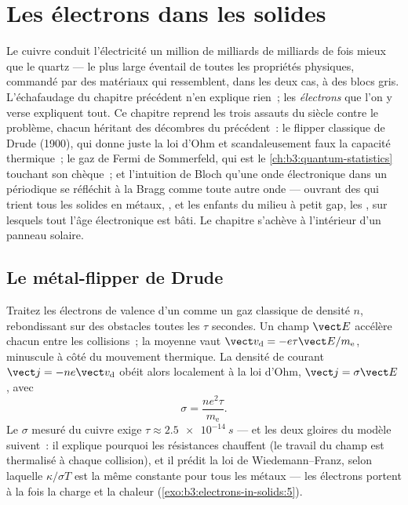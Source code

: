 \chapter{Les électrons dans les solides}\label{ch:b3:electrons-in-solids}


Le cuivre conduit l'électricité un million de milliards de milliards
de fois mieux que le quartz --- le plus large éventail de toutes les
propriétés physiques, commandé par des matériaux qui ressemblent, dans
les deux cas, à des blocs gris. L'échafaudage du chapitre précédent
n'en explique rien~; les \emph{électrons} que l'on y verse expliquent
tout. Ce chapitre reprend les trois assauts du siècle contre le
problème, chacun héritant des décombres du précédent~: le flipper
classique de Drude (1900), qui donne juste la loi d'Ohm et
scandaleusement faux la capacité thermique~; le gaz de Fermi de
Sommerfeld, qui est le \cref{ch:b3:quantum-statistics} touchant son
chèque~; et l'intuition de Bloch qu'une onde électronique dans un
 périodique se réfléchit à la Bragg comme toute autre onde ---
ouvrant des \emph{} qui trient tous les solides en
métaux, , et les enfants du milieu à petit gap, les
, sur lesquels tout l'âge électronique est bâti. Le
chapitre s'achève à l'intérieur d'un panneau solaire.

\section{Le métal-flipper de Drude}

\begin{proposition}\label{prop:b3:electrons-in-solids:drude}
Traitez les électrons de valence d'un  comme un gaz classique de
densité $n$, rebondissant sur des obstacles toutes les $\tau$
secondes. Un champ $\vect E$ accélère chacun entre les collisions~; la
\emph{} moyenne vaut
$\vect v_{\text{d}} = -e\tau\vect E/m_{\text{e}}$, minuscule à côté du
mouvement thermique. La densité de courant $\vect j =
-ne\vect v_{\text{d}}$ obéit alors localement à la loi d'Ohm,
$\vect j = \sigma\vect E$, avec
\[
\sigma = \frac{ne^2\tau}{m_{\text{e}}} .
\]
Le $\sigma$ mesuré du cuivre exige $\tau \approx \qty{2.5e-14}{s}$
--- et les deux gloires du modèle suivent~: il explique pourquoi les
résistances chauffent (le travail du champ est thermalisé à chaque
collision), et il prédit la loi de Wiedemann--Franz, selon laquelle
$\kappa/\sigma T$ est la même constante pour tous les métaux --- les
électrons portent à la fois la charge et la chaleur
(\cref{exo:b3:electrons-in-solids:5}).
\end{proposition}

